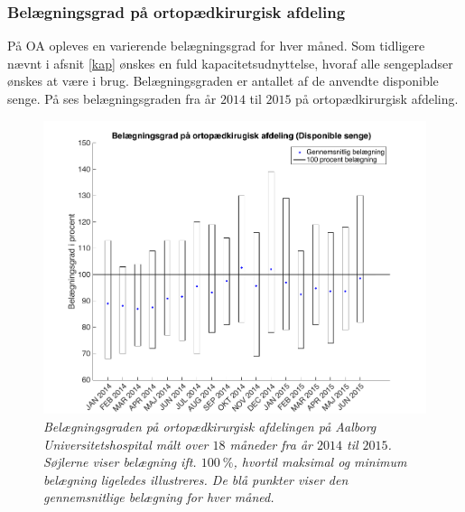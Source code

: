 \subsubsection{Belægningsgrad på ortopædkirurgisk afdeling}\label{omfang}
På OA opleves en varierende belægningsgrad for hver måned. Som tidligere nævnt i afsnit \ref{kap} ønskes en fuld kapacitetsudnyttelse, hvoraf alle sengepladser ønskes at være i brug. Belægningsgraden er antallet af de anvendte disponible senge. På  ses belægningsgraden fra år $2014$ til $2015$ på ortopædkirurgisk afdeling.\cite{SDS2015}

\begin{figure}[H]
	\flushleft 
	\centering
	\includegraphics[scale=.45]{figures/maxminoverbelaeg.png}
	\flushleft
	\caption{\textit{Belægningsgraden på ortopædkirurgisk afdelingen på Aalborg Universitetshospital målt over $18$ måneder fra år $2014$ til $2015$. Søjlerne viser belægning ift. $100~\%$, hvortil maksimal og minimum belægning ligeledes illustreres. De blå punkter viser den gennemsnitlige belægning for hver måned.}\cite{SDS2015}}
	\label{maxminbelaeg}
\end{figure}

